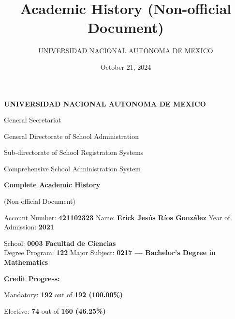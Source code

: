 \documentclass{article}
\title{Academic History (Non-official Document)}
\author{UNIVERSIDAD NACIONAL AUTONOMA DE MEXICO}
\date{October 21, 2024}
\begin{document}
\begin{minipage}{\textwidth}
    \begin{center}
        \textbf{UNIVERSIDAD NACIONAL AUTONOMA DE MEXICO}

        General Secretariat
        
        General Directorate of School Administration
        
        Sub-directorate of School Registration Systems
        
        Comprehensive School Administration System
    \end{center}
    \begin{center}
        {\fontsize{16}{18}\selectfont
        \textbf{Complete Academic History}}

        (Non-official Document)
    \end{center}
    Account Number: \textbf{421102323} \hfill Name: \textbf{Erick Jesús Ríos González} \hfill Year of Admission: \textbf{2021} \\
    
    \begin{center}
        School: \textbf{0003 Facultad de Ciencias} \\
        Degree Program: \textbf{122} Major Subject: \textbf{0217 — Bachelor's Degree in Mathematics} \\
    \end{center}
    
    \vspace{0.5cm}
    
    \noindent
    \begin{minipage}{0.45\textwidth}
        \begin{center}
            \textbf{\underline{Credit Progress:}}
        \end{center}
        \raggedleft
        Mandatory: \textbf{192} out of \textbf{192 (100.00\%)} 

        Elective: \textbf{74} out of \textbf{160 (46.25\%)}


\end{minipage}
\end{minipage}
\end{document}

